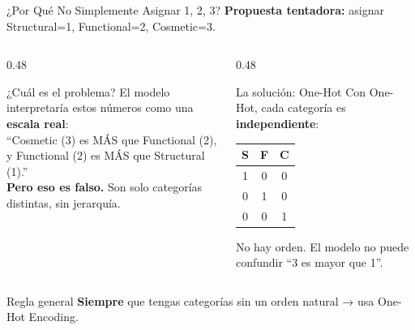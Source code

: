 \documentclass[aspectratio=169]{beamer}
\begin{document}
\begin{frame}{¿Por Qué No Simplemente Asignar 1, 2, 3?}
  \small
  \textbf{Propuesta tentadora:} asignar Structural=1, Functional=2, Cosmetic=3.
  \vspace{0.2cm}

  \begin{columns}[T]
    \begin{column}{0.48\textwidth}
      \begin{alertblock}{\faTimesCircle\enspace ¿Cuál es el problema?}
        \small
        El modelo interpretaría estos números como una \textbf{escala real}:\\[4pt]
        ``Cosmetic (3) es MÁS que Functional (2),\\
        y Functional (2) es MÁS que Structural (1).''\\[4pt]
        \textbf{Pero eso es falso.} Son solo categorías distintas, sin jerarquía.
      \end{alertblock}
    \end{column}
    \begin{column}{0.48\textwidth}
      \begin{block}{\faCheckCircle\enspace La solución: One-Hot}
        \small
        Con One-Hot, cada categoría es \textbf{independiente}:
        \vspace{4pt}
        \par{\tiny
        \begin{tabular}{|c|c|c|}
          \hline
          \textbf{S} & \textbf{F} & \textbf{C} \\\hline
          1 & 0 & 0 \\
          0 & 1 & 0 \\
          0 & 0 & 1 \\\hline
        \end{tabular}}

        \vspace{2pt}
        \par No hay orden. El modelo no puede confundir ``3 es mayor que 1''.
      \end{block}
    \end{column}
  \end{columns}

  \vspace{0.2cm}
  \begin{conceptbox}{\faKey\enspace Regla general}
    \centering\small
    \textbf{Siempre} que tengas categorías sin un orden natural → usa One-Hot Encoding.
  \end{conceptbox}
\end{frame}
\end{document}

